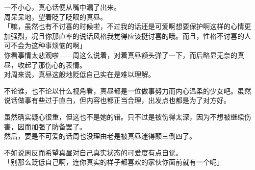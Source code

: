 一不小心，真心话便从嘴中漏了出来。\\

周呆呆地，望着眨了眨眼的真昼。\\

「嘛，虽然也有不讨喜的时候啦，不过我的话还是可爱啊想要保护啊这样的心情更加强烈，况且你那直率的说话风格我觉得应该挺讨喜的哦。而且，性格不讨喜的人可不会为这种事烦恼的啊」\\

你看事情太悲观啦——周这么说着，对着真昼额头弹了一下，而后略显无奈的真昼，收起了那伤心的表情。\\

对周来说，真昼这般地贬低自己实在是难以理解。

不论谁，也不论以什么视角看，真昼都是一位做事努力而内心温柔的少女吧。虽然说话做事有些过于直白，但内容也都正当合理，出发点也都是为了对方好。

虽然确实疑心很重，但这也不是她的错。只不过是被伤得太深，因为不想被继续伤害，因而加强了防备罢了。\\

然后，要是不可爱的话周也没理由老是被真昼迷得颠三倒四了。

不如说周反而希望真昼对自己真实状态的可爱度有点自觉。\\

「别那么贬低自己啊，连你真实的样子都喜欢的家伙你面前就有一个呢」\\

